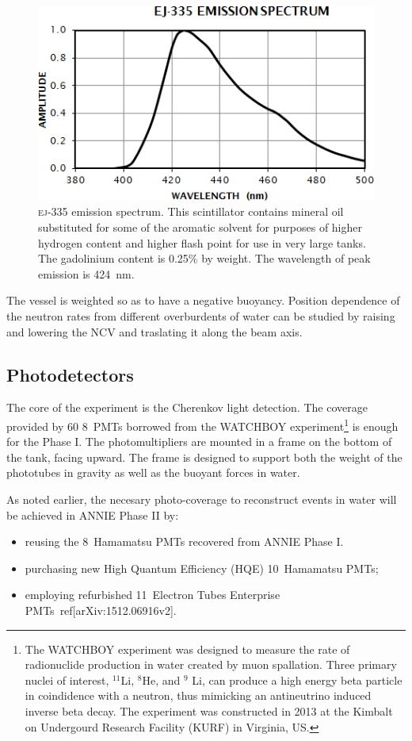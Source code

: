  \begin{figure}[]
   \centering
   \includegraphics[scale=0.60]{pics/ej335}
   \caption{\textsc{ej-335} emission spectrum. This scintillator contains mineral oil %
 substituted for some of the aromatic solvent for purposes of higher hydrogen content %
 and higher flash point for use in very large tanks. The gadolinium content is 0.25\% by weight.
 The wavelength of peak emission is 424~nm.}
   \label{fig:ej335}
 \end{figure}

 The vessel is weighted so as to have a negative buoyancy.
 Position dependence of the neutron rates from different overburdents of water can be %
 studied by raising and lowering the NCV and traslating it along the beam axis.

\subsection{Photodetectors}
\label{2.2.1}
 The core of the experiment is the Cherenkov light detection.
 The coverage provided by 60 8\inch~PMTs borrowed from the WATCHBOY experiment\footnote{The %
   WATCHBOY experiment was designed to measure the rate of radionuclide production in water %
   created by muon spallation. Three primary nuclei of interest, $^{11}$Li, $^8$He, and %
   $^9$ Li, can produce a high energy beta particle in coindidence with a neutron, thus mimicking %
   an antineutrino induced inverse beta decay. The experiment was constructed in 2013 at the %
   Kimbalt on Undergourd Research Facility (KURF) in Virginia, US.} is enough %
   for the Phase I.
 The photomultipliers are mounted in a frame on the bottom of the tank, facing upward.
 The frame is designed to support both the weight of the phototubes in gravity as well as the %
 buoyant forces in water. 

 As noted earlier, the necesary photo-coverage to reconstruct events in water %
 will be achieved in ANNIE Phase II by:
 \begin{itemize}
   \item reusing the 8\inch~Hamamatsu PMTs recovered from ANNIE Phase I.
   \item purchasing new High Quantum Efficiency (HQE) 10\inch~Hamamatsu PMTs;
   \item employing refurbished 11\inch~Electron Tubes Enterprise PMTs~ref[arXiv:1512.06916v2].
 \end{itemize}
 
